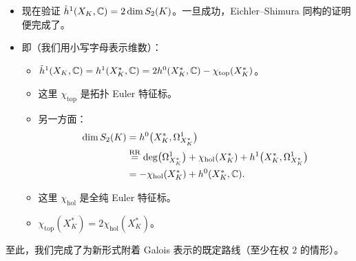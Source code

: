 \begin{itemize}
\begin{itemize}
\item 若 $\beta(f+g)=0$，则
\[
\beta(f+g)\cup\alpha(f)=\langle f,f\rangle=0,
\]
即 $f=0$。对 $g$ 同理。
\end{itemize}
\item 现在验证 $\tilde h^1(X_K,\mathbb{C})=2\dim S_2(K)$。一旦成功，Eichler--Shimura 同构的证明便完成了。
\item 即（我们用小写字母表示维数）：
\begin{itemize}
\item $\tilde h^1(X_K,\mathbb{C})=h^1(X^*_K,\mathbb{C})=2h^0(X^*_K,\mathbb{C})-\chi_{\mathrm{top}}(X^*_K)$。
\item 这里 $\chi_{\mathrm{top}}$ 是拓扑 Euler 特征标。
\item 另一方面：
\[
\begin{aligned}
\dim S_2(K)&=h^0\bigl(X^*_K,\Omega^1_{X^*_K}\bigr)\\
&\overset{\mathrm{RR}}{=}\deg\bigl(\Omega^1_{X^*_K}\bigr)+\chi_{\mathrm{hol}}(X^*_K)+h^1\bigl(X^*_K,\Omega^1_{X^*_K}\bigr)\\
&=-\chi_{\mathrm{hol}}(X^*_K)+h^0(X^*_K,\mathbb{C}).
\end{aligned}
\]
\item 这里 $\chi_{\mathrm{hol}}$ 是全纯 Euler 特征标。
\item $\chi_{\mathrm{top}}(X^*_K)=2\chi_{\mathrm{hol}}(X^*_K)$。
\end{itemize}
\end{itemize}

至此，我们完成了为新形式附着 Galois 表示的既定路线（至少在权 $2$ 的情形）。

